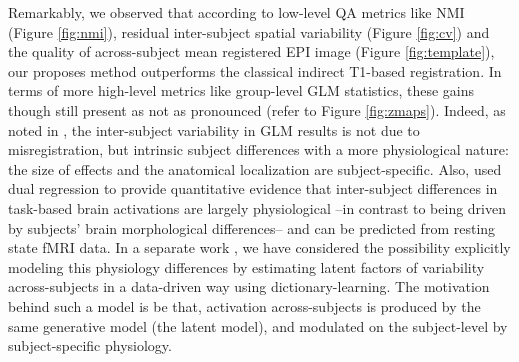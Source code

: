 Remarkably, we observed that according to low-level QA metrics
like NMI (Figure \ref{fig:nmi}), residual inter-subject spatial
variability (Figure \ref{fig:cv}) and the  quality of across-subject mean
registered EPI image (Figure \ref{fig:template}), our proposes method
outperforms the classical indirect T1-based registration.
%
In terms of more high-level metrics like group-level GLM statistics, these gains though still present as not as pronounced (refer to Figure \ref{fig:zmaps}). Indeed, as noted in
\cite{thirion2007analysis,pmid22425669}, the inter-subject variability
in GLM results is not due to misregistration, but intrinsic subject
differences with a more physiological nature: the size of effects and
the anatomical localization are subject-specific. Also, \cite{tavor2016task} used
dual regression \cite{Filippini2009} to provide quantitative evidence that inter-subject
differences in task-based brain activations are largely physiological --in contrast to being driven
by subjects' brain
morphological differences-- and can be predicted from resting state fMRI data.
In a separate work \cite{dohmatob2016}, we have considered the possibility explicitly
modeling this physiology differences by estimating latent
factors of variability across-subjects in a data-driven way using
dictionary-learning. The motivation behind such a model
is be that, activation across-subjects is produced by the same
generative model (the latent model), and modulated on the subject-level by
subject-specific physiology.



